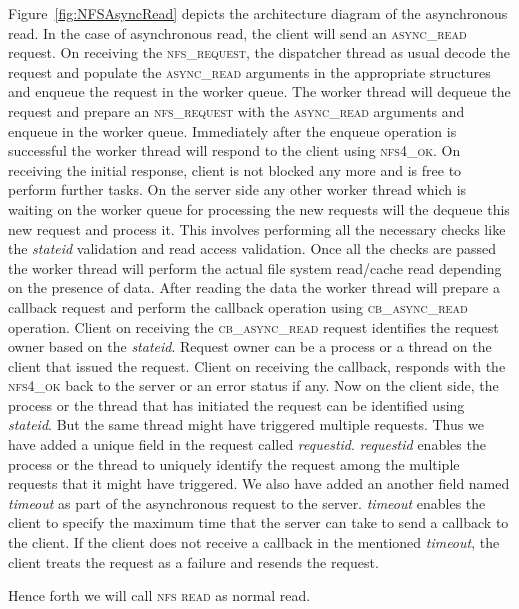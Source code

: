 Figure~\ref{fig:NFSAsyncRead} depicts the architecture diagram of the asynchronous read. 
In the case of asynchronous read, the client will send an \textsc{async\_read} request. On receiving the \textsc{nfs\_request}, the dispatcher thread as usual decode the request and populate the \textsc{async\_read} arguments in the appropriate structures and enqueue the request in the worker queue. The worker thread will dequeue the request and prepare an \textsc{nfs\_request} with the \textsc{async\_read} arguments and enqueue in the worker queue. Immediately after the enqueue operation is successful the worker thread will respond to the client using \textsc{nfs4\_ok}. On receiving the initial response, client is not blocked any more and is free to perform further tasks. On the server side any other worker thread which is waiting on the worker queue for processing the new requests will the dequeue this new request and process it. This involves performing all the necessary checks like the \textit{stateid} validation and read access validation. Once all the checks are passed the worker thread will perform the actual file system read/cache read depending on the presence of data. After reading the data the worker thread will prepare a callback request and perform the callback operation using \textsc{cb\_async\_read} operation. Client on receiving the \textsc{cb\_async\_read} request identifies the request owner based on the \textit{stateid}. Request owner can  be a process or a thread on the client that issued the request. Client on receiving the callback, responds with the \textsc{nfs4\_ok} back to the server or an error status if any. Now on the client side, the process or the thread that has initiated the request can be identified using \textit{stateid}. But the same thread might have triggered multiple requests. Thus we have added a unique field in the request called \textit{requestid}.  \textit{requestid} enables the process or the thread to uniquely identify the request among the multiple requests that it might have triggered. We also have added an another field named  \textit{timeout} as part of  the asynchronous request to the server. \textit{timeout} enables the client to specify the maximum time that the server can take to send a callback to the client. If the client does not receive a callback in the mentioned  \textit{timeout}, the client treats the request as a failure and resends the request.

Hence forth we will call \textsc{nfs read} as normal read.





